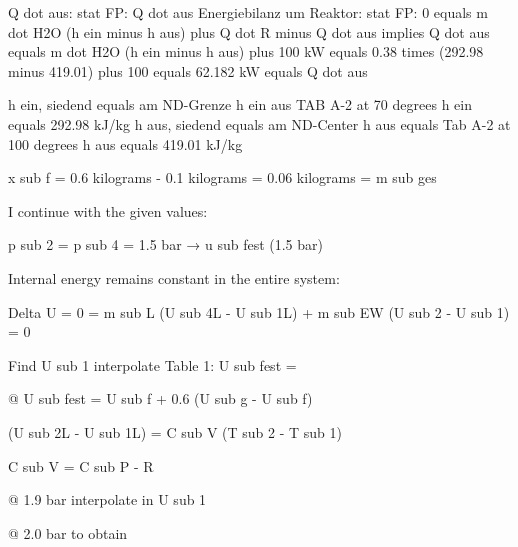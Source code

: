 Q dot aus: stat FP:  
Q dot aus  
Energiebilanz um Reaktor: stat FP:  
0 equals m dot H2O (h ein minus h aus) plus Q dot R minus Q dot aus  
implies Q dot aus equals m dot H2O (h ein minus h aus) plus 100 kW  
equals 0.38 times (292.98 minus 419.01) plus 100 equals 62.182 kW equals Q dot aus  

h ein, siedend equals am ND-Grenze  
h ein aus TAB A-2 at 70 degrees h ein equals 292.98 kJ/kg  
h aus, siedend equals am ND-Center  
h aus equals Tab A-2 at 100 degrees h aus equals 419.01 kJ/kg

x sub f = 0.6 kilograms - 0.1 kilograms = 0.06 kilograms = m sub ges

I continue with the given values:

p sub 2 = p sub 4 = 1.5 bar → u sub fest (1.5 bar)

Internal energy remains constant in the entire system:

Delta U = 0 = m sub L (U sub 4L - U sub 1L) + m sub EW (U sub 2 - U sub 1) = 0

Find U sub 1 interpolate Table 1: U sub fest = 

@ U sub fest = U sub f + 0.6 (U sub g - U sub f)

(U sub 2L - U sub 1L) = C sub V (T sub 2 - T sub 1)

C sub V = C sub P - R

@ 1.9 bar interpolate in U sub 1

@ 2.0 bar to obtain